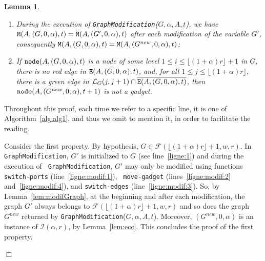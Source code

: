 \documentclass[11pt]{article}
\newtheorem{lemma}{Lemma}[section]
\newcommand{\qed}{\hfill $\Box$ \bigbreak}
\newenvironment{proof}{\noindent {\bf Proof.}}{\qed}
\begin{document}
{\begin{lemma}
\begin{enumerate}
\item During the execution of {\tt GraphModification}($G,\alpha,A,t$), we have 
  ${\tt M}(A,(G,0,\alpha),t)={\tt M}(A,(G',0,\alpha),t)$ after each
  modification of the variable $G'$, consequently ${\tt M}(A,(G,0,\alpha),t)={\tt M}(A,(G^{new},0,\alpha),t)$;

\item If ${\tt node}(A,(G,0,\alpha),t)$ is a node of some level
  $1\leq i\leq\lfloor(1+\alpha)r\rfloor+1$ in $G$, there is no red edge in ${\tt E}(A,(G,0,\alpha),t)$, and, for all $1\leq j \leq
  \lfloor(1+\alpha)r\rfloor$, there is a green edge in
  $\mathcal{L}_{G}(j,j+1)\cap\overline{{\tt E}(A,(G,0,\alpha),t)}$,
  then ${\tt node}(A,(G^{new},0,\alpha),t+1)$ is not a gadget.
\end{enumerate}
\end{lemma}

\begin{proof}
Throughout this proof, each time we refer to a specific line, it is one of Algorithm~\ref{alg:alg1}, and thus we
omit to mention it, in order to facilitate the reading.


  Consider the first property. By hypothesis,
  $G\in\mathcal{F}(\lfloor(1+\alpha)r\rfloor+1,w,r)$. In {\tt
    GraphModification}, $G'$ is initialized to $G$ (see
  line~\ref{ligne:1}) and during the execution of {\tt
    GraphModification}, $G'$ may only be modified using functions {\tt
    switch\mbox{-}ports} (line~\ref{ligne:modif:1}), {\tt
    move\mbox{-}gadget} (lines~\ref{ligne:modif:2}
  and~\ref{ligne:modif:4}), and {\tt switch\mbox{-}edges}
  (line~\ref{ligne:modif:3}). So, by Lemma~\ref{lem:modifGraph}, at the beginning and after each modification, the graph $G'$ always belongs to $\mathcal{F}(\lfloor(1+\alpha)r\rfloor+1,w,r)$ and so does the graph $G^{new}$ returned by {\tt GraphModification}($G,\alpha,A,t$). Moreover, $(G^{new},0,\alpha)$ is an instance
  of $\mathcal{I}(\alpha,r)$, by Lemma~\ref{lem:ecc}. This concludes
  the proof of the first property.


\end{proof}}
\end{document}
